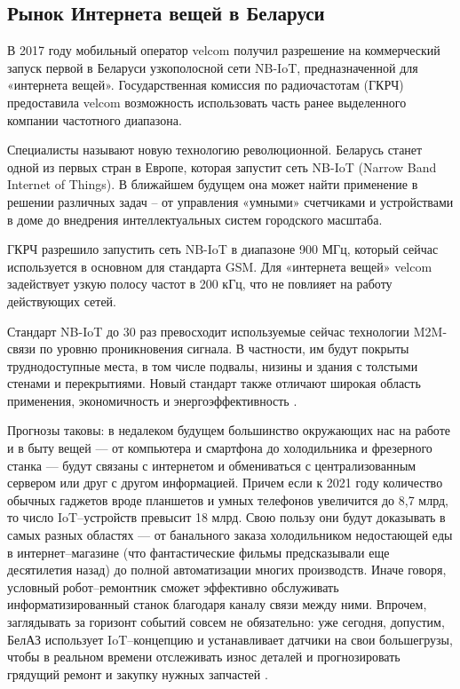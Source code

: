 \subsection{Рынок Интернета вещей в Беларуси}
\label{sec:analysis:belarus}

В 2017 году мобильный оператор velcom получил разрешение на коммерческий запуск первой в Беларуси узкополосной сети NB-IoT, предназначенной для «интернета вещей». Государственная комиссия по радиочастотам (ГКРЧ) предоставила velcom возможность использовать часть ранее выделенного компании частотного диапазона.

Специалисты называют новую технологию революционной. Беларусь станет одной из первых стран в Европе, которая запустит сеть NB-IoT (Narrow Band Internet of Things). В ближайшем будущем она может найти применение в решении различных задач – от управления «умными» счетчиками и устройствами в доме до внедрения интеллектуальных систем городского масштаба.

ГКРЧ разрешило запустить сеть NB-IoT в диапазоне 900 МГц, который сейчас используется в основном для стандарта GSM. Для «интернета вещей» velcom задействует узкую полосу частот в 200 кГц, что не повлияет на работу действующих сетей.

Стандарт NB-IoT до 30 раз превосходит используемые сейчас технологии M2M-связи по уровню проникновения сигнала. В частности, им будут покрыты труднодоступные места, в том числе подвалы, низины и здания с толстыми стенами и перекрытиями. Новый стандарт также отличают широкая область применения, экономичность и энергоэффективность \cite{iot_belarus_velcom}.

Прогнозы таковы: в недалеком будущем большинство окружающих нас на работе и в быту вещей — от компьютера и смартфона до холодильника и фрезерного станка — будут связаны с интернетом и обмениваться с централизованным сервером или друг с другом информацией. Причем если к 2021 году количество обычных гаджетов вроде планшетов и умных телефонов увеличится до 8,7 млрд, то число IoT–устройств превысит 18 млрд. Свою пользу они будут доказывать в самых разных областях — от банального заказа холодильником недостающей еды в интернет–магазине (что фантастические фильмы предсказывали еще десятилетия назад) до полной автоматизации многих производств. Иначе говоря, условный робот–ремонтник сможет эффективно обслуживать информатизированный станок благодаря каналу связи между ними. Впрочем, заглядывать за горизонт событий совсем не обязательно: уже сегодня, допустим, БелАЗ использует IoT–концепцию и устанавливает датчики на свои большегрузы, чтобы в реальном времени отслеживать износ деталей и прогнозировать грядущий ремонт и закупку нужных запчастей \cite{iot_belarus_prog}.